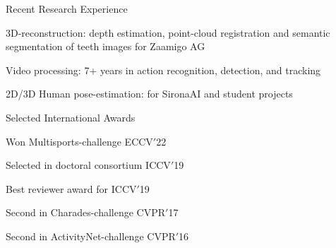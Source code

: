 \documentclass{resume} %
\begin{document}
\begin{paracol}{2}
\begin{rSection}{Recent Research Experience}{} 
\begin{sSubsection}{3D-reconstruction: depth estimation, point-cloud registration and semantic segmentation of teeth images for Zaamigo AG}\end{sSubsection}
\begin{sSubsection}{Video processing: 7+ years in action recognition, detection, and tracking}\end{sSubsection}
\begin{sSubsection}{ 2D/3D Human pose-estimation: for SironaAI and student projects}\end{sSubsection}

\end{rSection}
\switchcolumn
\vspace{0.75mm}
\begin{rSection}{Selected International Awards }{}
\begin{sSubsection}{Won Multisports-challenge ECCV$'$22}\end{sSubsection} %
\begin{sSubsection}{Selected in doctoral consortium ICCV$'$19}\end{sSubsection}  %
\begin{sSubsection}{Best reviewer award for ICCV$'$19}\end{sSubsection} %
\begin{sSubsection}{Second in Charades-challenge CVPR$'$17}\end{sSubsection} %
\begin{sSubsection}{Second in ActivityNet-challenge CVPR$'$16}\end{sSubsection} %
\end{rSection}


\end{paracol}
\end{document}
